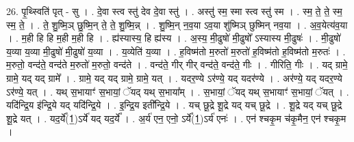 \documentclass[17pt]{extarticle}
\begin{document}
26. पृ॒थ्स्विति॑ पृत् - सु । . दे॒वा स्त्व स्तु॑ देव दे॒वा स्तु॑ । . अस्तु॑ स्म॒ स्मा स्त्व स्तु॑ स्म । . स्म॒ ते॒ ते॒ स्म॒ स्म॒ ते॒ । . ते॒ शु॒ष्मि॒ञ् छु॒ष्मि॒न् ते॒ ते॒ शु॒ष्मि॒न्न् । . शु॒ष्मि॒न् न॒व॒या ऽव॒या शु॑ष्मिञ् छुष्मिन् नव॒या । . अ॒व॒येत्य॑व॒या । . म॒ही हि हि म॒ही म॒ही हि । . ह्य॑स्यास्य॒ हि ह्य॑स्य । . अ॒स्य॒ मी॒ढुषो॑ मी॒ढुषो᳚ ऽस्यास्य मी॒ढुषः॑ । . मी॒ढुषो॑ य॒व्या य॒व्या मी॒ढुषो॑ मी॒ढुषो॑ य॒व्या । . य॒व्येति॑ य॒व्या । . ह॒विष्म॑तो म॒रुतो॑ म॒रुतो॑ ह॒विष्म॑तो ह॒विष्म॑तो म॒रुतः॑ । . म॒रुतो॒ वन्द॑ते॒ वन्द॑ते म॒रुतो॑ म॒रुतो॒ वन्द॑ते । . वन्द॑ते॒ गीर् गीर् वन्द॑ते॒ वन्द॑ते॒ गीः । . गीरिति॒ गीः । . यद् ग्रामे॒ ग्रामे॒ यद् यद् ग्रामे᳚ । . ग्रामे॒ यद् यद् ग्रामे॒ ग्रामे॒ यत् । . यदर॒ण्ये ऽर॑ण्ये॒ यद् यदर॑ण्ये । . अर॑ण्ये॒ यद् यदर॒ण्ये ऽर॑ण्ये॒ यत् । . यथ् स॒भायाꣳ॑ स॒भायां॒ ॅयद् यथ् स॒भाया᳚म् । . स॒भायां॒ ॅयद् यथ् स॒भायाꣳ॑ स॒भायां॒ ॅयत् । . यदि॑न्द्रि॒य इ॑न्द्रि॒ये यद् यदि॑न्द्रि॒ये । . इ॒न्द्रि॒य इती᳚न्द्रि॒ये । . यच् छू॒द्रे शू॒द्रे यद् यच् छू॒द्रे । . शू॒द्रे यद् यच् छू॒द्रे शू॒द्रे यत् । . यद॒र्ये᳚(1॒)ऽर्ये॑ यद् यद॒र्ये᳚ । . अ॒र्य॑ एन॒ एनो॒ ऽर्ये᳚(1॒)ऽर्य॑ एनः॑ । . एन॑ श्चकृ॒म च॑कृ॒मैन॒ एन॑ श्चकृ॒म । \newline
\end{document}
